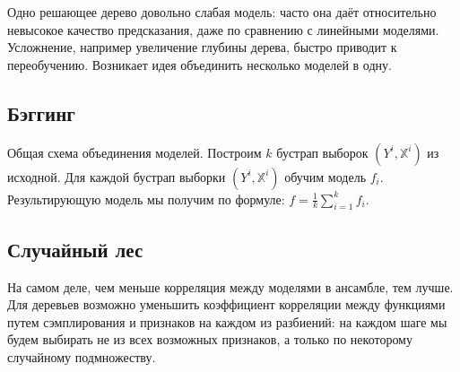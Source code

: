 \documentclass[12pt,a4paper]{article}
\begin{document}
Одно решающее дерево довольно слабая модель: часто она даёт относительно невысокое качество предсказания, даже по сравнению с линейными моделями. Усложнение, например увеличение глубины дерева, быстро приводит к переобучению. Возникает идея объединить несколько моделей в одну. 

\subsection{Бэггинг}

Общая схема объединения моделей. Построим $k$ бустрап выборок  $(Y^i, \mathbb X^i)$ из исходной. Для каждой бустрап выборки $(Y^i, \mathbb X^i)$  обучим модель $f_i$. Результирующую модель мы получим по формуле: $f = \frac{1}{k}\sum_{i=1}^{k}{f_i}$.  

\subsection{Случайный лес}

На самом деле, чем меньше корреляция между моделями в ансамбле, тем лучше. Для деревьев возможно уменьшить коэффициент корреляции между функциями путем сэмплирования и признаков на каждом из разбиений: на каждом шаге мы будем выбирать не из всех возможных признаков, а только по некоторому случайному подмножеству.
  
\end{document}
